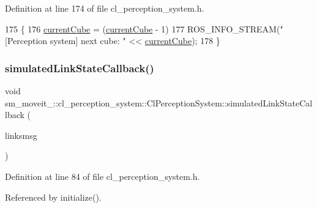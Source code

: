 Definition at line 174 of file cl\+\_\+perception\+\_\+system.\+h.


\begin{DoxyCode}
175   \{
176     \hyperlink{classsm__moveit__3_1_1cl__perception__system_1_1ClPerceptionSystem_ad915fc687481d4157ec40de52f8eaa82}{currentCube} = (\hyperlink{classsm__moveit__3_1_1cl__perception__system_1_1ClPerceptionSystem_ad915fc687481d4157ec40de52f8eaa82}{currentCube} - 1) %
177     ROS\_INFO\_STREAM(\textcolor{stringliteral}{"[Perception system] next cube: "} << \hyperlink{classsm__moveit__3_1_1cl__perception__system_1_1ClPerceptionSystem_ad915fc687481d4157ec40de52f8eaa82}{currentCube});
178   \}
\end{DoxyCode}
\mbox{\label{classsm__moveit__3_1_1cl__perception__system_1_1ClPerceptionSystem_a540c3a50c29e6ec58f6fcd7e993d9dff}} 
\subsubsection{\texorpdfstring{simulated\+Link\+State\+Callback()}{simulatedLinkStateCallback()}}
{\footnotesize\ttfamily void sm\+\_\+moveit\+\_\+::cl\+\_\+perception\+\_\+system\+::\+Cl\+Perception\+System\+::simulated\+Link\+State\+Callback (\begin{DoxyParamCaption}\item[{const gazebo\+\_\+msgs\+::\+Link\+States \&}]{linksmsg }\end{DoxyParamCaption})\hspace{0.3cm}{\ttfamily [inline]}}



Definition at line 84 of file cl\+\_\+perception\+\_\+system.\+h.



Referenced by initialize().


